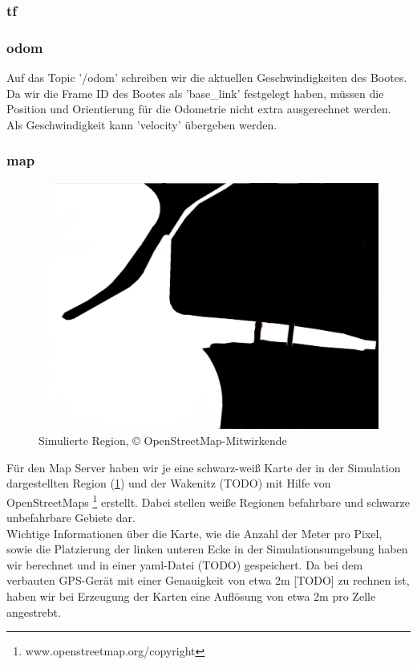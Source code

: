 \documentclass[conference]{IEEEtran}
\begin{document}
\subsubsection{tf}
\subsubsection{odom}
Auf das Topic '/odom' schreiben wir die aktuellen Geschwindigkeiten des Bootes. Da wir die Frame ID des Bootes als 'base\_link' festgelegt haben, müssen die Position und Orientierung für die Odometrie nicht extra ausgerechnet werden. Als Geschwindigkeit kann 'velocity' übergeben werden.
\subsubsection{map}
\begin{figure}
	\includegraphics[width=\linewidth]{diluvio.jpg}
	\caption{Simulierte Region, © OpenStreetMap-Mitwirkende}
	\label{diluvio}
\end{figure}
Für den Map Server haben wir je eine schwarz-weiß Karte der in der Simulation dargestellten Region (\ref{diluvio}) und der Wakenitz (TODO) mit Hilfe von OpenStreetMaps \footnote{www.openstreetmap.org/copyright } erstellt. Dabei stellen weiße Regionen befahrbare und schwarze unbefahrbare Gebiete dar.\\
Wichtige Informationen über die Karte, wie die Anzahl der Meter pro Pixel, sowie die Platzierung der linken unteren Ecke in der Simulationsumgebung haben wir berechnet und in einer yaml-Datei (TODO) gespeichert. Da bei dem verbauten GPS-Gerät mit einer Genauigkeit von etwa 2m [TODO] zu rechnen ist, haben wir bei Erzeugung der Karten eine Auflösung von etwa 2m pro Zelle angestrebt.
\end{document}
